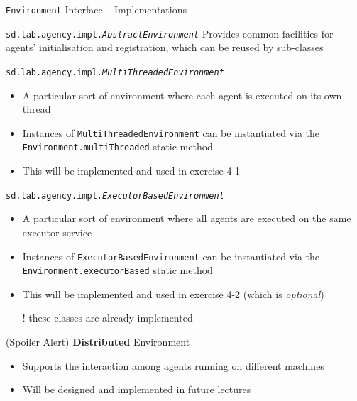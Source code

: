 \documentclass[presentation]{beamer}\mode<presentation>{\usetheme{AMSCesenaPurpleAndGold}}
\newcommand{\labN}{4}
\begin{document}
\begin{frame}[allowframebreaks]{\texttt{Environment} Interface -- Implementations}

    \begin{block}{\texttt{sd.lab.agency.impl.\textit{AbstractEnvironment}}}
        Provides common facilities for agents' initialisation and registration, which can be reused by sub-classes
    \end{block}

    \bigskip

    \begin{exampleblock}{\texttt{sd.lab.agency.impl.\textit{MultiThreadedEnvironment}}}
        \begin{itemize}
			\item A particular sort of environment where each agent is executed on its own thread
			\item Instances of \texttt{MultiThreadedEnvironment} can be instantiated via the \alert{\texttt{Environment.multiThreaded}} static method
			\item This will be implemented and used in exercise \labN{}-1
        \end{itemize}
    \end{exampleblock}

	\bigskip

	\begin{exampleblock}{\texttt{sd.lab.agency.impl.\textit{ExecutorBasedEnvironment}}}
		\begin{itemize}
			\item A particular sort of environment where all agents are executed on the same executor service
			\item Instances of \texttt{ExecutorBasedEnvironment} can be instantiated via the \alert{\texttt{Environment.executorBased}} static method
			\item This will be implemented and used in exercise \labN{}-2 (which is \emph{optional})
		\end{itemize}
	\end{exampleblock}

    \bigskip

    \begin{itemize}
        \item[!] these classes are already implemented
    \end{itemize}

    \framebreak

    \begin{alertblock}{(Spoiler Alert) \textbf{Distributed} Environment}
        \begin{itemize}
        	\item Supports the interaction among agents running on different machines
        	\item Will be designed and implemented in future lectures
        \end{itemize}
    \end{alertblock}

\end{frame}
\end{document}
